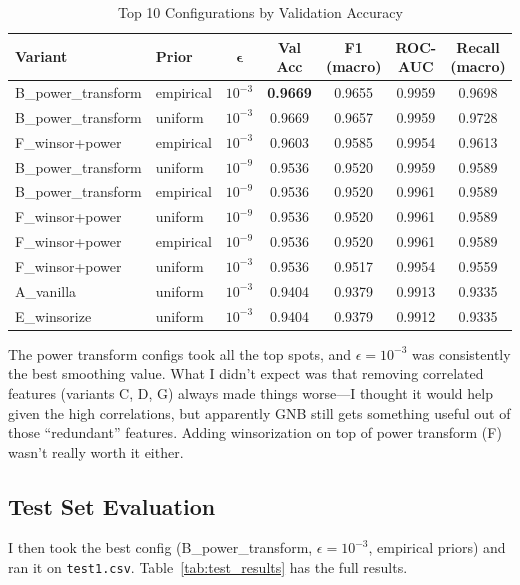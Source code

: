 \documentclass[journal,onecolumn]{IEEEtran}
\begin{document}
\begin{table}[H]
\centering
\caption{Top 10 Configurations by Validation Accuracy}
\label{tab:top10_configs}
\begin{tabular}{llccccc}
\toprule
\textbf{Variant} & \textbf{Prior} & $\boldsymbol{\epsilon}$ & \textbf{Val Acc} & \textbf{F1 (macro)} & \textbf{ROC-AUC} & \textbf{Recall (macro)} \\
\midrule
B\_power\_transform & empirical & $10^{-3}$ & \textbf{0.9669} & 0.9655 & 0.9959 & 0.9698 \\
B\_power\_transform & uniform & $10^{-3}$ & 0.9669 & 0.9657 & 0.9959 & 0.9728 \\
F\_winsor+power & empirical & $10^{-3}$ & 0.9603 & 0.9585 & 0.9954 & 0.9613 \\
B\_power\_transform & uniform & $10^{-9}$ & 0.9536 & 0.9520 & 0.9959 & 0.9589 \\
B\_power\_transform & empirical & $10^{-9}$ & 0.9536 & 0.9520 & 0.9961 & 0.9589 \\
F\_winsor+power & uniform & $10^{-9}$ & 0.9536 & 0.9520 & 0.9961 & 0.9589 \\
F\_winsor+power & empirical & $10^{-9}$ & 0.9536 & 0.9520 & 0.9961 & 0.9589 \\
F\_winsor+power & uniform & $10^{-3}$ & 0.9536 & 0.9517 & 0.9954 & 0.9559 \\
A\_vanilla & uniform & $10^{-3}$ & 0.9404 & 0.9379 & 0.9913 & 0.9335 \\
E\_winsorize & uniform & $10^{-3}$ & 0.9404 & 0.9379 & 0.9912 & 0.9335 \\
\bottomrule
\end{tabular}
\end{table}

The power transform configs took all the top spots, and $\epsilon = 10^{-3}$ was consistently the best smoothing value. What I didn't expect was that removing correlated features (variants C, D, G) always made things worse---I thought it would help given the high correlations, but apparently GNB still gets something useful out of those ``redundant'' features. Adding winsorization on top of power transform (F) wasn't really worth it either.

\subsection{Test Set Evaluation}

I then took the best config (B\_power\_transform, $\epsilon = 10^{-3}$, empirical priors) and ran it on \texttt{test1.csv}. Table~\ref{tab:test_results} has the full results.
\end{document}

